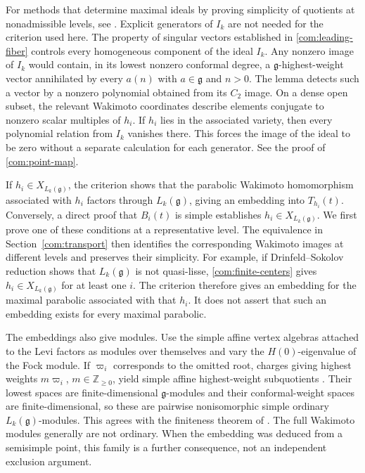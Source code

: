 \documentclass[11pt,a4paper]{amsart}
\numberwithin{equation}{section}
\theoremstyle{definition}
\theoremstyle{remark}
\newcommand{\Z}{\mathbb Z}
\newcommand{\g}{\mathfrak g}
\begin{document}
For methods that determine maximal ideals by proving simplicity of
quotients at nonadmissible levels, see \cite{APVMaximal2026}.
Explicit generators of $I_k$ are not needed for the criterion used here.
The property of singular vectors established in \cref{com:leading-fiber}
controls every homogeneous component of the ideal $I_k$. Any nonzero
image of $I_k$ would contain,
in its lowest nonzero conformal degree, a $\g$-highest-weight vector
annihilated by every $a(n)$ with $a\in\g$ and $n>0$. The lemma
detects such a vector by a nonzero polynomial obtained from its
$C_2$ image. On a dense open subset, the relevant Wakimoto coordinates
describe elements conjugate to nonzero scalar multiples of $h_i$.
If $h_i$ lies in the associated variety, then every polynomial
relation from $I_k$ vanishes there. This forces the image
of the ideal to be zero without a separate calculation for each generator. See the proof of \cref{com:point-map}.

If $h_i\in X_{L_k(\g)}$, the criterion shows that the parabolic
Wakimoto homomorphism associated with $h_i$ factors through
$L_k(\g)$, giving an embedding into $T_{h_i}(t)$.
Conversely, a direct proof that $B_i(t)$ is simple establishes
$h_i\in X_{L_k(\g)}$. We first prove one of these conditions
at a representative level. The equivalence in
Section~\ref{com:transport} then identifies the corresponding
Wakimoto images at different levels and preserves their simplicity.
For example, if Drinfeld--Sokolov reduction shows that
$L_k(\g)$ is not quasi-lisse, \cref{com:finite-centers} gives
$h_i\in X_{L_k(\g)}$ for at least one $i$. The criterion therefore
gives an embedding for the maximal parabolic associated with
that $h_i$. It does not assert that such an embedding exists
for every maximal parabolic.

The embeddings also give modules. Use the simple affine vertex algebras
attached to the Levi factors as modules over themselves and vary the $H(0)$-eigenvalue of the Fock
module. If $\varpi_i$ corresponds to the omitted root, charges giving
highest weights $m\varpi_i$, $m\in\Z_{\ge0}$, yield simple affine
highest-weight subquotients \cite[Section~7.1]{ABGG}. Their lowest spaces
are finite-dimensional $\g$-modules and their conformal-weight spaces
are finite-dimensional, so these are pairwise nonisomorphic simple
ordinary $L_k(\g)$-modules. This agrees with the finiteness theorem
of \cite{AK}. The full Wakimoto modules generally are not ordinary.
When the embedding was deduced from a semisimple point, this family
is a further consequence, not an independent exclusion argument.
\end{document}
